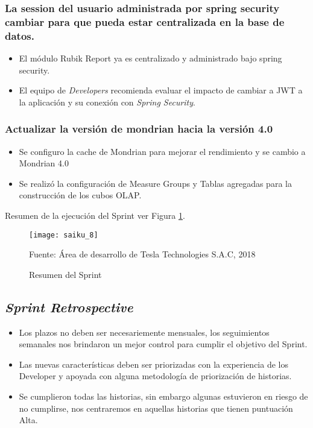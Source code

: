 \begin{spacing}{1.5}
		\subsubsection{La session del usuario administrada por spring security cambiar para que pueda estar centralizada en la base de datos.}
			\begin{itemize}
				\item El m\'{o}dulo Rubik Report ya es centralizado y administrado bajo spring security.
				\item El equipo de \textit{Developers} recomienda evaluar el impacto de cambiar a JWT a la aplicaci\'{o}n y su conexi\'{o}n con \textit{Spring Security}.
			\end{itemize}			
		\subsubsection{Actualizar la versi\'{o}n de mondrian hacia la versi\'{on 4.0}}
		
		\begin{itemize}
			\item Se configuro la cache de Mondrian para mejorar el rendimiento y se cambio a Mondrian 4.0
			\item Se realiz\'{o} la configuraci\'{o}n de Measure Groups y Tablas agregadas para la construcci\'{o}n de los cubos OLAP.
		\end{itemize}
	
		Resumen de la ejecuci\'{o}n del Sprint ver Figura \ref{figure:chaperIII_10}.
		
		\begin{figure}[H]
			\centering
			\texttt{[image: saiku\_8]}
			\caption {\centering \small{Resumen del Sprint}} \label{figure:chaperIII_10}
			\small {Fuente: \'{A}rea de desarrollo de Tesla Technologies S.A.C, 2018}
		\end{figure}
		
			
	\subsection{\textit{Sprint Retrospective}}
	\begin{itemize}
		\item Los plazos no deben ser necesariemente mensuales, los seguimientos semanales nos brindaron un mejor control para cumplir el objetivo del Sprint.
		\item Las nuevas caracter\'{i}sticas deben ser priorizadas con la experiencia de los Developer y apoyada con alguna metodolog\'{i}a de priorizaci\'{o}n de historias.
		\item Se cumplieron todas las historias, sin embargo algunas estuvieron en riesgo de no cumplirse, nos centraremos en aquellas historias que tienen puntuaci\'{o}n Alta.
	\end{itemize}


\end{spacing}
